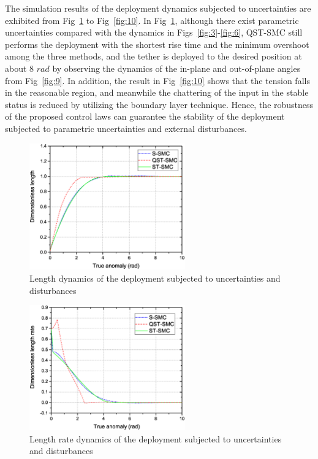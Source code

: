 \documentclass[3p]{elsarticle}
\theoremstyle{plain}
\theoremstyle{remark}
\begin{document}
The simulation results of the deployment dynamics subjected to uncertainties are exhibited from Fig~\ref{fig:7} to Fig~\ref{fig:10}. In Fig~\ref{fig:7}, although there exist parametric uncertainties compared with the dynamics in Figs~\ref{fig:3}-\ref{fig:6}, QST-SMC still performs the deployment with the shortest rise time and the minimum overshoot among the three methods, and the tether is deployed to the desired position at about 8 $rad$ by observing the dynamics of the in-plane and out-of-plane angles from Fig~\ref{fig:9}. In addition, the result in Fig~\ref{fig:10} shows that the tension falls in the reasonable region, and meanwhile the chattering of the input in the stable status is reduced by utilizing the boundary layer technique. Hence, the robustness of the proposed control laws can guarantee the stability of the deployment subjected to parametric uncertainties and external disturbances.
\begin{figure}
\centering
\includegraphics[width=0.6\textwidth]{paper4_fig7_20161025.eps}
\caption{Length dynamics of the deployment subjected to uncertainties and disturbances}
\label{fig:7}
\end{figure}
\begin{figure}
\centering
\includegraphics[width=0.6\textwidth]{paper4_fig8_20161025.eps}
\caption{Length rate dynamics of the deployment subjected to uncertainties and disturbances}
\label{fig:8}
\end{figure}
\end{document}
